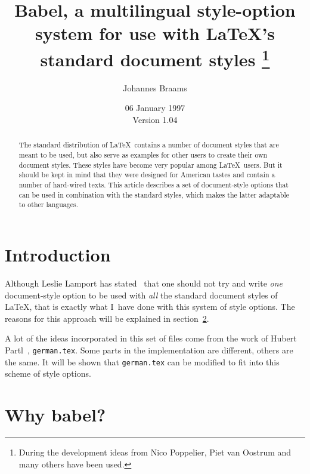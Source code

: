 \documentclass{ltugboat}
\newcommand\address[1]{}
\newcommand\netaddress[1]{}
\newcommand{\file}[1]{\texttt{#1}}
\newcommand{\babel}{\textsf{babel}}
\begin{document}
\title {Babel, a multilingual style-option system for use
        with \LaTeX's standard document styles%
       \thanks{During the development ideas from Nico Poppelier,
               Piet van Oostrum and many others have been used.}
       }

\author{Johannes Braams}
\address{%
  \TeX niek\\
  Kersengaarde 33\\
  2723 BP Zoetermeer\\
  The Netherlands}
\netaddress{babel@braams.cistron.nl}
\date{06 January 1997 \\
  Version 1.04}

\maketitle

\begin{abstract}
  The standard distribution of \LaTeX\ contains a number of document
  styles that are meant to be used, but also serve as examples for
  other users to create their own document styles.  These styles have
  become very popular among \LaTeX\ users.  But it should be kept in
  mind that they were designed for American tastes and contain a
  number of hard-wired texts. This article describes a set of
  document-style options that can be used in combination with the
  standard styles, which makes the latter adaptable to other
  languages.
\end{abstract}

\section{Introduction}

Although Leslie Lamport has stated~\cite{LLth} that one should not try
and write \emph{one} document-style option to be used with \emph{all}
the standard document styles of \LaTeX, that is exactly what I~have
done with this system of style options. The reasons for this approach
will be explained in section~\ref{why}.

A lot of the ideas incorporated in this set of files come from the
work of Hubert Partl~\cite{HP}, \file{german.tex}. Some parts in the
implementation are different, others are the same. It will be shown
that \file{german.tex} can be modified to fit into this scheme of
style options.

\section{Why \babel?}\label{why}
\end{document}
